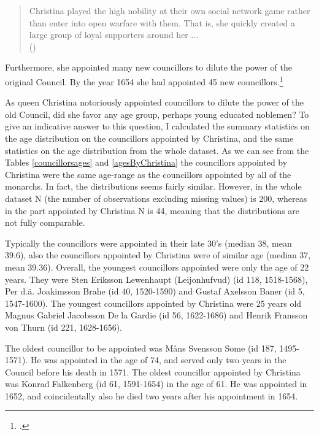 \begin{quote}
	Christina played the high nobility at their own social network game rather than enter into open warfare with them. That is, she quickly created a large group of loyal supporters around her $\dots$\\
	(\cite[p. 64]{HakanenAKoskinen2017})
\end{quote}

Furthermore, she appointed many new councillors to dilute the power of the original Council. By the year 1654 she had appointed 45 new councillors.\footcite[p. 64.]{HakanenAKoskinen2017}

As queen Christina notoriously appointed councillors to dilute the power of the old Council, did she favor any age group, perhaps young educated noblemen? To give an indicative answer to this question, I calculated the summary statistics on the age distribution on the councillors appointed by Christina, and the same statistics on the age distribution from the whole dataset. As we can see from the Tables \ref{councillorsages} and \ref{agesByChristina} the councillors appointed by Christina were the same age-range as the councillors appointed by all of the monarchs. In fact, the distributions seems fairly similar. However, in the whole dataset N (the number of observations excluding missing values) is 200, whereas in the part appointed by Christina N is 44, meaning that the distributions are not fully comparable.

Typically the councillors were appointed in their late 30's (median 38, mean 39.6), also the councillors appointed by Christina were of similar age (median 37, mean 39.36). Overall, the youngest councillors appointed were only the age of 22 years. They were Sten Eriksson Lewenhaupt (Leijonhufvud) (id 118, 1518-1568), Per d.ä. Joakimsson Brahe (id 40, 1520-1590) and Gustaf Axelsson Baner (id 5, 1547-1600). The youngest councillors appointed by Christina were 25 years old Magnus Gabriel Jacobsson De la Gardie (id 56, 1622-1686) and Henrik Fransson von Thurn (id 221, 1628-1656).

The oldest councillor to be appointed was Måns Svensson Some (id 187, 1495-1571). He was appointed in the age of 74, and served only two years in the Council before his death in 1571. The oldest councillor appointed by Christina was Konrad Falkenberg (id 61, 1591-1654) in the age of 61. He was appointed in 1652, and coincidentally also he died two years after his appointment in 1654.


